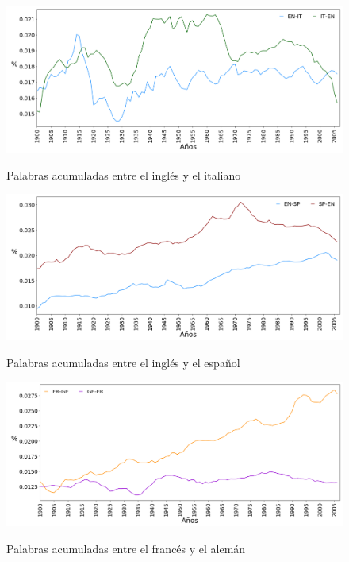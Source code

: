 \begin{figure}[h!]
	\centering
	\includegraphics[scale=.38]{Cap_4/SF_3_S2_EN.png}
	\label{fig.SF_EI}
	\caption{Palabras acumuladas entre el inglés y el italiano}
\end{figure}

\begin{figure}[h!]
	\centering
	\includegraphics[scale=.38]{Cap_4/SF_4_S2_EN.png}
	\label{fig.SF_ES}
	\caption{Palabras acumuladas entre el inglés y el español}
\end{figure}

\begin{figure}[h!]
	\centering
	\includegraphics[scale=.38]{Cap_4/SF_2_S2_FR.png}
	\label{fig.SF_FG}
	\caption{Palabras acumuladas entre el francés y el alemán}
\end{figure}

